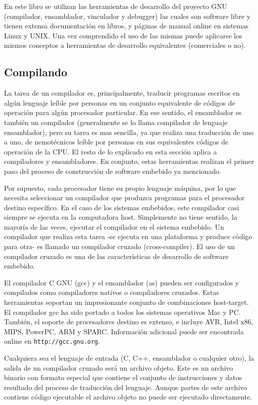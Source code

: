 \documentclass[output=paper, 
colorlinks,
citecolor=brown,
newtxmath
]{langscibook}
\begin{document}
En este libro se utilizan las herramientas de desarrollo del proyecto GNU
(compilador, ensamblador, vinculador y debugger) las cuales son software libre
y tienen extensa documentación en libros, y páginas de manual online en sistemas
Linux y UNIX. Una vez comprendido
el uso de las mismas puede aplicarse los mismos conceptos a herramientas
de desarrollo equivalentes (comerciales o no).

\subsection {Compilando}

La tarea de un compilador es, principalmente, traducir programas escritos en 
algún lenguaje leíble por personas en un conjunto equivalente
de códigos de operación para algún procesador particular. En ese sentido,
el ensamblador es también un compilador (generalmente se lo llama
compilador de lenguaje ensamblador), pero su tarea es mas sencilla, ya que
realiza una traducción de uno a uno, de nemotécnicos leíble por personas
en sus equivalentes códigos de operación de la CPU. El resto de lo explicado en esta sección
aplica a compiladores y ensambladores. En conjunto, estas herramientas
realizan el primer paso del proceso de construcción de software embebido
ya mencionado.

Por supuesto, cada procesador tiene su propio lenguaje máquina, por lo que
necesita seleccionar un compilador que produzca programas para el procesador
destino específico. En el caso de los sistemas embebidos,  este compilador
casi siempre se ejecuta en la computadora host. Simplemente no tiene sentido,
la mayoría de las veces, ejecutar el compilador en el sistema embebido.
Un compilador que realiza esta tarea -se ejecuta en una plataforma  y produce
código para otra- es llamado un compilador cruzado (cross-compiler). El uso de
un compilador cruzado es una de las características de desarrollo de software
embebido.

El compilador C GNU (gcc) y el ensamblador (as) pueden ser configurados y compilados
como compiladores nativos o compiladores cruzados. Estas herramientas soportan
un impresionante conjunto de combinaciones host-target. El compilador gcc ha sido
portado a todos los sistemas operativos Mac y PC. También, el soporte de procesadores destino
es extenso, e incluye AVR, Intel x86, MIPS, PowerPC, ARM y SPARC. Información
adicional puede ser encontrada online en \texttt{http://gcc.gnu.org}.

Cualquiera sea el lenguaje de entrada (C, C++, ensamblador o cualquier otro), la salida
de un compilador cruzado será un archivo objeto. Este es un archivo binario con
formato especial que contiene el conjunto de instrucciones y datos
resultado del proceso de traducción del lenguaje. Aunque partes de este archivo
contiene código ejecutable el archivo objeto no puede ser ejecutado directamente.
\end{document}
